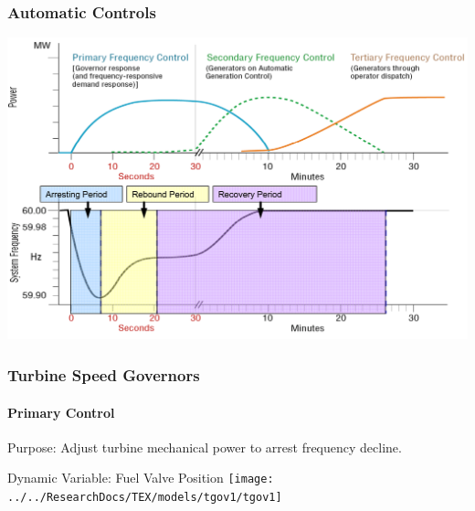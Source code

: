 \documentclass[14pt, unknownkeysallowed]{beamer}
\begin{document}
\begin{frame}
\frametitle{Automatic Controls}
\begin{center}
\includegraphics[height=.82\textheight]{ctrlReactionFlip} {\tiny\cite{ctrlTimeScale}}%
\end{center}
\end{frame}
\begin{frame}
\frametitle{Turbine Speed Governors}
\framesubtitle{Primary Control}

Purpose: Adjust turbine mechanical power to arrest frequency decline.\\
\vspace{.5em}

Dynamic Variable: Fuel Valve Position 
{\centering\texttt{[image: ../../ResearchDocs/TEX/models/tgov1/tgov1]}}

\end{frame}
\end{document}
